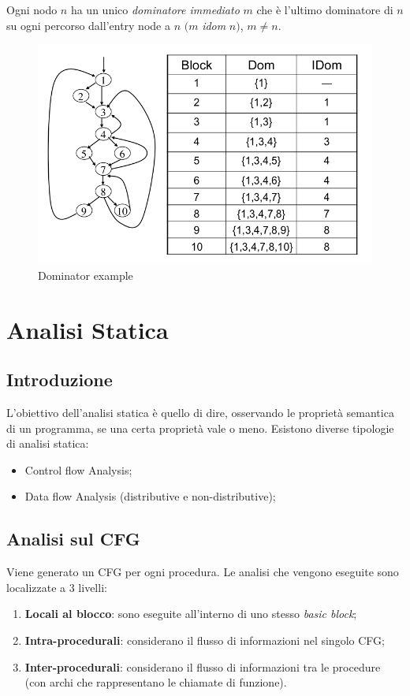 \documentclass[a4paper, 11pt]{report}
\begin{document}
Ogni nodo $n$ ha un unico \textit{dominatore immediato} $m$ che è l'ultimo dominatore di $n$ su ogni percorso dall'entry node a $n$ $(m$ \textit{idom} $n)$, $m\neq n$.

\begin{figure}[H]
	\centering
	\includegraphics[scale=0.32]{DominatorExample}
	\caption{Dominator example}
\end{figure}



\chapter*{Analisi Statica}

\section*{Introduzione}
L'obiettivo dell'analisi statica è quello di dire, osservando le proprietà semantica di un programma, se una certa proprietà vale o meno. Esistono diverse tipologie di analisi statica: \begin{itemize}
	\item Control flow Analysis;
	\item Data flow Analysis (distributive e non-distributive);
\end{itemize}

\section*{Analisi sul CFG}
Viene generato un CFG per ogni procedura. Le analisi che vengono eseguite sono localizzate a 3 livelli: \begin{enumerate}
	\item \textbf{Locali al blocco}: sono eseguite all'interno di uno stesso \textit{basic block};
	\item \textbf{Intra-procedurali}: considerano il flusso di informazioni nel singolo CFG;
	\item \textbf{Inter-procedurali}: considerano il flusso di informazioni tra le procedure (con archi che rappresentano le chiamate di funzione).
\end{enumerate}
\end{document}
